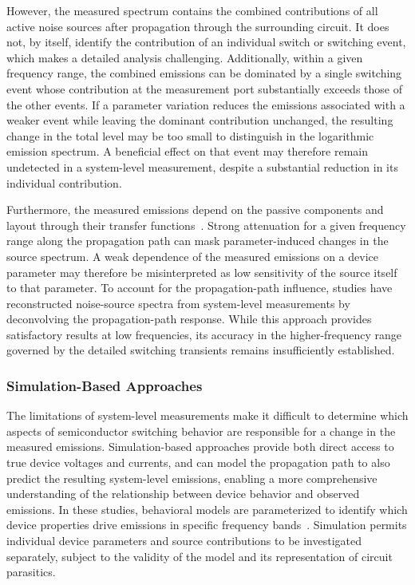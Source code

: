 However, the measured spectrum contains the combined contributions of all active noise sources after propagation through the surrounding circuit.
It does not, by itself, identify the contribution of an individual switch or switching event, which makes a detailed analysis challenging.
Additionally, within a given frequency range, the combined emissions can be dominated by a single switching event whose contribution at the measurement port substantially exceeds those of the other events.
If a parameter variation reduces the emissions associated with a weaker event while leaving the dominant contribution unchanged, the resulting change in the total level may be too small to distinguish in the logarithmic emission spectrum.
A beneficial effect on that event may therefore remain undetected in a system-level measurement, despite a substantial reduction in its individual contribution.

Furthermore, the measured emissions depend on the passive components and layout through their transfer functions~\cite{xie_high_2019,phukan_characterization_2023}.
Strong attenuation for a given frequency range along the propagation path can mask parameter-induced changes in the source spectrum.
A weak dependence of the measured emissions on a device parameter may therefore be misinterpreted as low sensitivity of the source itself to that parameter.
To account for the propagation-path influence, studies have reconstructed noise-source spectra from system-level measurements by deconvolving the propagation-path response.
While this approach provides satisfactory results at low frequencies, its accuracy in the higher-frequency range governed by the detailed switching transients remains insufficiently established.

\subsubsection*{Simulation-Based Approaches}
The limitations of system-level measurements make it difficult to determine which aspects of semiconductor switching behavior are responsible for a change in the measured emissions.
Simulation-based approaches provide both direct access to true device voltages and currents, and can model the propagation path to also predict the resulting system-level emissions, enabling a more comprehensive understanding of the relationship between device behavior and observed emissions.
In these studies, behavioral models are parameterized to identify which device properties drive emissions in specific frequency bands~\cite{hillenbrand_sensitivity_2017, kragl_semiconductor-focused_2025, liu_modeling_2016, yuan_emi_2015}.
Simulation permits individual device parameters and source contributions to be investigated separately, subject to the validity of the model and its representation of circuit parasitics.

